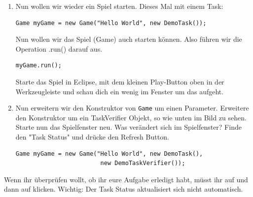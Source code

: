 

\begin{enumerate}
    \item Nun wollen wir wieder ein Spiel starten. Dieses Mal mit einem Task:

    \begin{lstlisting}
Game myGame = new Game("Hello World", new DemoTask());
    \end{lstlisting}

    Nun wollen wir das Spiel (Game) auch starten können. Also führen wir die Operation .run() darauf aus.

    \begin{lstlisting}
myGame.run();
    \end{lstlisting}

    Starte das Spiel in Eclipse, mit dem kleinen Play-Button oben in der Werkzeugleiste und schau dich ein wenig im Fenster um das aufgeht.

    \item Nun erweitern wir den Konstruktor von \texttt{Game} um einen Parameter. Erweitere den Konstruktor um ein TaskVerifier Objekt, so wie unten im Bild zu sehen. Starte nun das Spielfenster neu. Was verändert sich im Spielfenster? Finde den "Task Status" und drücke den Refresh Button.

    \begin{lstlisting}
Game myGame = new Game("Hello World", new DemoTask(),
                        new DemoTaskVerifier());
    \end{lstlisting}

    \end{enumerate}
    \begin{Infobox}
    Wenn ihr überprüfen wollt, ob ihr eure Aufgabe erledigt habt, müsst ihr auf  und dann auf  klicken.
    Wichtig: Der Task Status aktualisiert sich nicht automatisch.
    \end{Infobox}
